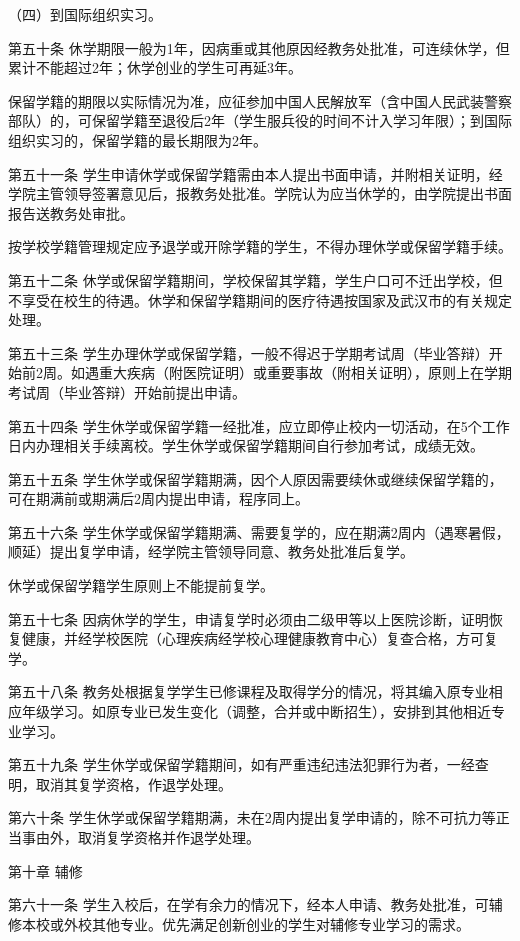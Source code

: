 \documentclass[UTF8,12pt,a4paper]{report}
\begin{document}
（四）到国际组织实习。

第五十条  休学期限一般为1年，因病重或其他原因经教务处批准，可连续休学，但累计不能超过2年；休学创业的学生可再延3年。

保留学籍的期限以实际情况为准，应征参加中国人民解放军（含中国人民武装警察部队）的，可保留学籍至退役后2年（学生服兵役的时间不计入学习年限）；到国际组织实习的，保留学籍的最长期限为2年。

第五十一条  学生申请休学或保留学籍需由本人提出书面申请，并附相关证明，经学院主管领导签署意见后，报教务处批准。学院认为应当休学的，由学院提出书面报告送教务处审批。

按学校学籍管理规定应予退学或开除学籍的学生，不得办理休学或保留学籍手续。

第五十二条  休学或保留学籍期间，学校保留其学籍，学生户口可不迁出学校，但不享受在校生的待遇。休学和保留学籍期间的医疗待遇按国家及武汉市的有关规定处理。

第五十三条  学生办理休学或保留学籍，一般不得迟于学期考试周（毕业答辩）开始前2周。如遇重大疾病（附医院证明）或重要事故（附相关证明），原则上在学期考试周（毕业答辩）开始前提出申请。

第五十四条  学生休学或保留学籍一经批准，应立即停止校内一切活动，在5个工作日内办理相关手续离校。学生休学或保留学籍期间自行参加考试，成绩无效。

第五十五条  学生休学或保留学籍期满，因个人原因需要续休或继续保留学籍的，可在期满前或期满后2周内提出申请，程序同上。

第五十六条  学生休学或保留学籍期满、需要复学的，应在期满2周内（遇寒暑假，顺延）提出复学申请，经学院主管领导同意、教务处批准后复学。

休学或保留学籍学生原则上不能提前复学。

第五十七条  因病休学的学生，申请复学时必须由二级甲等以上医院诊断，证明恢复健康，并经学校医院（心理疾病经学校心理健康教育中心）复查合格，方可复学。

第五十八条  教务处根据复学学生已修课程及取得学分的情况，将其编入原专业相应年级学习。如原专业已发生变化（调整，合并或中断招生），安排到其他相近专业学习。

第五十九条  学生休学或保留学籍期间，如有严重违纪违法犯罪行为者，一经查明，取消其复学资格，作退学处理。

第六十条  学生休学或保留学籍期满，未在2周内提出复学申请的，除不可抗力等正当事由外，取消复学资格并作退学处理。



第十章  辅修

第六十一条  学生入校后，在学有余力的情况下，经本人申请、教务处批准，可辅修本校或外校其他专业。优先满足创新创业的学生对辅修专业学习的需求。
\end{document}
